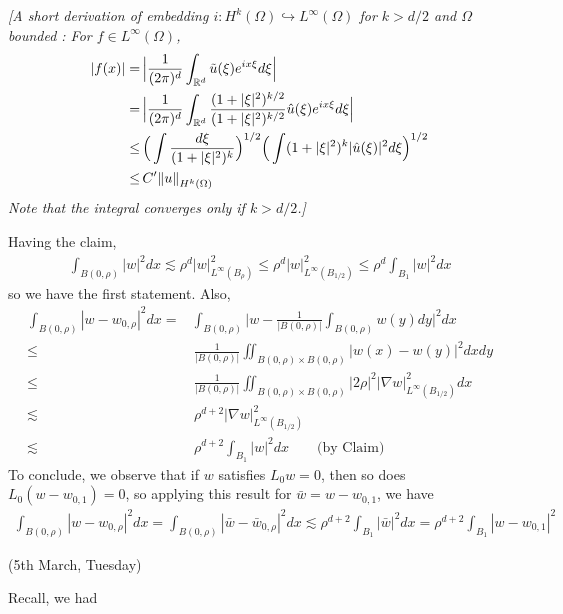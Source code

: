 \documentclass[12pt,a4paper]{article}
\newenvironment{proof}
{\begin{changemargin}{0.5cm}{0.5cm} 
	}%
	{\end{changemargin}
}
\newenvironment{subproof}
{\begin{changemargin}{0.5cm}{0.5cm} 
	}%
	{\end{changemargin}
}
\newenvironment{p}
{\begin{proof} 
	}%
	{\end{proof}
}
\begin{document}
\begin{p}
\begin{subproof}
\emph{[A short derivation of embedding $i : H^k(\Omega) \hookrightarrow L^{\infty}(\Omega)$ for $k>d/2$ and $\Omega$ bounded : For $f\in L^{\infty}(\Omega)$,
\begin{align*}
|f(x)| =&\, \Big| \frac{1}{(2\pi)^d} \int_{\reals^d} \tilde{u}(\xi) e^{ix\xi} d\xi\Big| \\
=&\, \Big| \frac{1}{(2\pi)^d}\int_{\reals^d} \frac{(1+|\xi|^2)^{k/2}}{(1+|\xi|^2)^{k/2}}\hat{u}(\xi)e^{ix\xi} d\xi \Big| \\
\leq &\, \Big( \int \frac{d\xi}{(1+|\xi|^2)^{k}}\Big)^{1/2}\Big( \int (1+|\xi|^2)^{k}|\hat{u}(\xi)|^2 d\xi\Big)^{1/2} \\
\leq &\, C' \snorms{u}{H^k(\Omega)} 
\end{align*}
Note that the integral converges only if $k>d/2$.]}
\end{subproof}
Having the claim,
\begin{align*}
\int_{B(0, \rho)} |w|^2 dx \lesssim \rho^d |w|^2_{L^{\infty}(B_{\rho})} \leq \rho^d |w|^2_{L^{\infty}(B_{1/2})} \leq \rho^d \int_{B_1} |w|^2 dx
\end{align*}
so we have the first statement. Also,
\begin{align*}
\int_{B(0, \rho)}|w - w_{0, \rho}|^2 dx =& \int_{B(0, \rho)}\Big|w - \frac{1}{|B(0, \rho)|} \int_{B(0, \rho)} w(y) dy \Big|^2 dx \\
\leq & \, \frac{1}{|B(0, \rho)|} \iint_{B(0, \rho) \times B(0, \rho)} |w(x) - w(y)|^2 dxdy \\
\leq & \, \frac{1}{|B(0, \rho)|} \iint_{B(0, \rho) \times B(0, \rho)} |2 \rho|^2 |\nabla w|_{L^{\infty}(B_{1/2})}^2 dx \\
\lesssim & \,\rho^{d+2} |\nabla w|_{L^{\infty}(B_{1/2})}^2 \\
\lesssim & \, \rho^{d+2} \int_{B_1} |w|^2 dx \quad \quad \text{(by Claim)}
\end{align*}
To conclude, we observe that if $w$ satisfies $L_0 w=0$, then so does $L_0 (w - w_{0,1})=0$, so applying this result for $\bar{w} = w-w_{0,1}$, we have
\begin{align*}
\int_{B(0, \rho)}|w - w_{0, \rho}|^2 dx = \int_{B(0, \rho)}|\bar{w} - \bar{w}_{0, \rho}|^2 dx \lesssim \rho^{d+2} \int_{B_1} |\bar w|^2 dx = \rho^{d+2} \int_{B_1} |w-w_{0,1}|^2
\end{align*}
\eop
\end{p}
\s

\newday

(5th March, Tuesday)
\s

Recall, we had
\s
\end{document}
